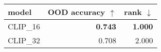 \begin{tabular}{lrr}
\toprule
   model & OOD accuracy $\uparrow$ & rank $\downarrow$ \\
\midrule
CLIP\_16 &          \textbf{0.743} &    \textbf{1.000} \\
CLIP\_32 &                   0.708 &             2.000 \\
\bottomrule
\end{tabular}

